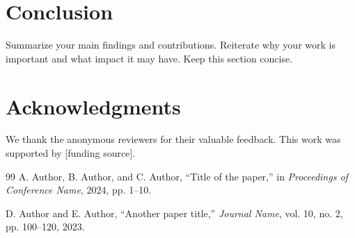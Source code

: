 \documentclass[10pt,conference]{IEEEtran}
\begin{document}
\section{Conclusion}
\label{sec:conclusion}

Summarize your main findings and contributions. Reiterate why your work is important and what impact it may have. Keep this section concise.

\section*{Acknowledgments}
We thank the anonymous reviewers for their valuable feedback. This work was supported by [funding source].


% 

\begin{thebibliography}{99}
A. Author, B. Author, and C. Author,
``Title of the paper,''
in \textit{Proceedings of Conference Name},
2024, pp. 1--10.

D. Author and E. Author,
``Another paper title,''
\textit{Journal Name},
vol. 10, no. 2, pp. 100--120,
2023.
\end{thebibliography}
\end{document}
